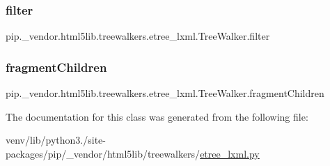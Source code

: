 \subsubsection{\texorpdfstring{filter}{filter}}
{\footnotesize\ttfamily pip.\+\_\+vendor.\+html5lib.\+treewalkers.\+etree\+\_\+lxml.\+Tree\+Walker.\+filter}

\mbox{\label{classpip_1_1__vendor_1_1html5lib_1_1treewalkers_1_1etree__lxml_1_1TreeWalker_aeab5aec483df1c681d4b6744eefcc8c5}} 
\subsubsection{\texorpdfstring{fragment\+Children}{fragmentChildren}}
{\footnotesize\ttfamily pip.\+\_\+vendor.\+html5lib.\+treewalkers.\+etree\+\_\+lxml.\+Tree\+Walker.\+fragment\+Children}



The documentation for this class was generated from the following file\+:\begin{DoxyCompactItemize}
\item 
venv/lib/python3./site-\/packages/pip/\+\_\+vendor/html5lib/treewalkers/\hyperlink{treewalkers_2etree__lxml_8py}{etree\+\_\+lxml.\+py}\end{DoxyCompactItemize}
